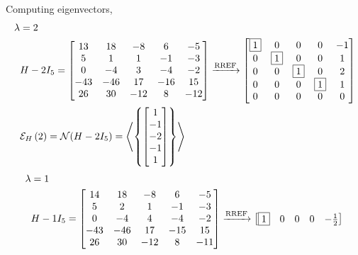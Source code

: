 \documentclass{ximera}
\begin{document}
\begin{example}
  Computing eigenvectors,
  \begin{align*}
    \lambda&=2\\&H-2I_5=
                  \begin{bmatrix}
                    13 & 18 & -8 & 6 & -5\\
                    5 & 1 & 1 & -1 & -3\\
                    0 & -4 & 3 & -4 & -2\\
                    -43 & -46 & 17 & -16 & 15\\
                    26 & 30 & -12 & 8 & -12
                  \end{bmatrix}
                                        \xrightarrow{\text{RREF}}
                                        \begin{bmatrix}
                                          \fbox{1} & 0 & 0 & 0 & -1\\
                                          0 & \fbox{1} & 0 & 0 & 1\\
                                          0 & 0 & \fbox{1} & 0 & 2\\
                                          0 & 0 & 0 & \fbox{1} & 1\\
                                          0 & 0 & 0 & 0 & 0
                                        \end{bmatrix}\\
           &\mathcal{E}_{H}\left(2\right)=\mathcal{N}\!\left(H-2I_5\right)
             =\left\langle\left\{\begin{bmatrix}1\\-1\\-2\\-1\\1\end{bmatrix}\right\}\right\rangle
  \end{align*}
  \begin{align*}
    \lambda&=1\\&H-1I_5=
                  \begin{bmatrix}
                    14 & 18 & -8 & 6 & -5\\
                    5 & 2 & 1 & -1 & -3\\
                    0 & -4 & 4 & -4 & -2\\
                    -43 & -46 & 17 & -15 & 15\\
                    26 & 30 & -12 & 8 & -11
                  \end{bmatrix}
                                        \xrightarrow{\text{RREF}}
                                        \begin{bmatrix}
                                          \fbox{1} & 0 & 0 & 0 & -\frac{1}{2}\\

\end{bmatrix}
\end{align*}
\end{example}
\end{document}
